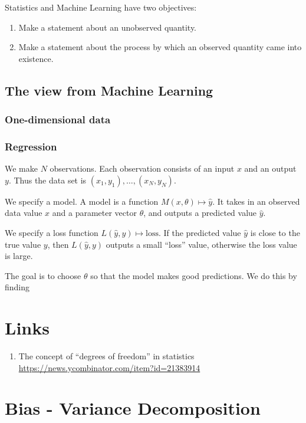 \documentclass[12pt]{article}
\begin{document}
Statistics and Machine Learning have two objectives:

\begin{enumerate}
\item Make a statement about an unobserved quantity.
\item Make a statement about the process by which an observed quantity came into existence.
\end{enumerate}


\subsection*{The view from Machine Learning}

\subsubsection*{One-dimensional data}

\subsubsection*{Regression}
We make $N$ observations. Each observation consists of an input $x$ and an output $y$. Thus the
data set is $(x_1, y_1), \ldots, (x_N, y_N)$.

We specify a model. A model is a function $M(x, \theta) \mapsto \hat y$. It takes in an observed data value $x$
and a parameter vector $\theta$, and outputs a predicted value $\hat y$.

We specify a loss function $L(\hat y, y) \mapsto \text{loss}$. If the predicted value $\hat y$ is close to the true
value $y$, then $L(\hat y, y)$ outputs a small ``loss'' value, otherwise the loss value is large.

The goal is to choose $\theta$ so that the model makes good predictions. We do this by finding


\section{Links}
\begin{enumerate}
\item The concept of ``degrees of freedom'' in statistics \url{https://news.ycombinator.com/item?id=21383914}
\end{enumerate}

\newpage
\section*{Bias - Variance Decomposition}
\end{document}
